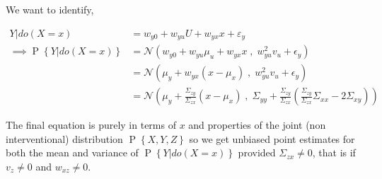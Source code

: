 \documentclass{article}
\newcommand{\E}[1]{\mathbb E\left[#1\right]}
\newcommand{\eq}[1]{\begin{align*}#1\end{align*}}
\renewcommand{\P}[1]{\operatorname{P}\left\{#1\right\}}
\newcommand{\N}[2]{\mathcal{N}\left({#1}\;,\;{#2}\right)}
\theoremstyle{plain}
\theoremstyle{definition}
\begin{document}
We want to identify,

\eq{
Y|do(X=x) &= w_{y0}+w_{yu}U+w_{yx}x+\varepsilon_y  \\
\implies \P{Y|do(X=x)} &=\N{w_{y0}+w_{yu}\mu_u+w_{yx}x}{w_{yu}^2 v_u+\epsilon_y}\\
&=\N{\mu_y+w_{yx}(x-\mu_x)}{w_{yu}^2 v_u+\epsilon_y}\\
&= \N{\mu_y+ \frac{\Sigma_{zy}}{\Sigma_{zx}}(x-\mu_x)}{\Sigma_{yy} + \frac{\Sigma_{zy}}{\Sigma_{zx}}\left(\frac{\Sigma_{zy}}{\Sigma_{zx}}\Sigma_{xx} - 2\Sigma_{xy} \right)}
}

The final equation is purely in terms of $x$ and properties of the joint (non interventional) distribution $\P{X,Y,Z}$ so we get unbiased point estimates for both the mean and variance of $\P{Y|do(X=x)}$ provided $\Sigma_{zx} \neq 0$, that is if $v_z \neq 0$ and $w_{xz} \neq 0$. 

%
%
%
%
%
%
%
%
\end{document}

